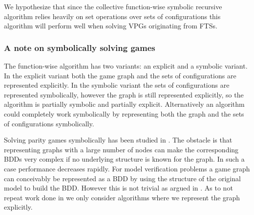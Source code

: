 We hypothesize that since the collective function-wise symbolic recursive algorithm relies heavily on set operations over sets of configurations this algorithm will perform well when solving VPGs originating from FTSs.

\subsubsection{A note on symbolically solving games}
The function-wise algorithm has two variants: an explicit and a symbolic variant. In the explicit variant both the game graph and the sets of configurations are represented explicitly. In the symbolic variant the sets of configurations are represented symbolically, however the graph is still represented explicitly, so the algorithm is partially symbolic and partially explicit. Alternatively an algorithm could completely work symbolically by representing both the graph and the sets of configurations symbolically.

Solving parity games symbolically has been studied in \cite{BDDSolvingPG}. The obstacle is that representing graphs with a large number of nodes can make the corresponding BDDs very complex if no underlying structure is known for the graph. In such a case performance decreases rapidly. For model verification problems a game graph can conceivably be represented as a BDD by using the structure of the original model to build the BDD. However this is not trivial as argued in \cite{BDDSolvingPG}. As to not repeat work done in \cite{BDDSolvingPG} we only consider algorithms where we represent the graph explicitly. 

